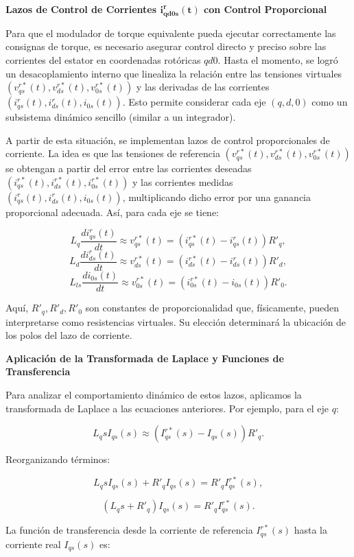 \documentclass{article}
\begin{document}
\textbf{Lazos de Control de Corrientes \(\boldsymbol{i^r_{q d 0 s}(t)}\) con Control Proporcional}

Para que el modulador de torque equivalente pueda ejecutar correctamente las consignas de torque, es necesario asegurar control directo y preciso sobre las corrientes del estator en coordenadas rotóricas \( qd0 \). Hasta el momento, se logró un desacoplamiento interno que linealiza la relación entre las tensiones virtuales \((v_{qs}^{r*}(t), v_{ds}^{r*}(t), v_{0s}^{r*}(t))\) y las derivadas de las corrientes \((i_{qs}^r(t), i_{ds}^r(t), i_{0s}(t))\). Esto permite considerar cada eje \((q,d,0)\) como un subsistema dinámico sencillo (similar a un integrador).

A partir de esta situación, se implementan lazos de control proporcionales de corriente. La idea es que las tensiones de referencia \((v_{qs}^{r*}(t), v_{ds}^{r*}(t), v_{0s}^{r*}(t))\) se obtengan a partir del error entre las corrientes deseadas \((i_{qs}^{r*}(t), i_{ds}^{r*}(t), i_{0s}^{r*}(t))\) y las corrientes medidas \((i_{qs}^r(t), i_{ds}^r(t), i_{0s}(t))\), multiplicando dicho error por una ganancia proporcional adecuada. Así, para cada eje se tiene:

\[
L_q \frac{d i_{qs}^r(t)}{dt} \approx v_{qs}^{r*}(t) = (i_{qs}^{r*}(t) - i_{qs}^r(t)) R'_q,
\]
\[
L_d \frac{d i_{ds}^r(t)}{dt} \approx v_{ds}^{r*}(t) = (i_{ds}^{r*}(t) - i_{ds}^r(t)) R'_d,
\]
\[
L_{ls} \frac{d i_{0s}(t)}{dt} \approx v_{0s}^{r*}(t) = (i_{0s}^{r*}(t) - i_{0s}(t)) R'_0.
\]

Aquí, \(R'_q, R'_d, R'_0\) son constantes de proporcionalidad que, físicamente, pueden interpretarse como resistencias virtuales. Su elección determinará la ubicación de los polos del lazo de corriente.

\textbf{Aplicación de la Transformada de Laplace y Funciones de Transferencia}

Para analizar el comportamiento dinámico de estos lazos, aplicamos la transformada de Laplace a las ecuaciones anteriores. Por ejemplo, para el eje \(q\):

\[
L_q s I_{qs}(s) \approx (I_{qs}^{r*}(s) - I_{qs}(s)) R'_q.
\]

Reorganizando términos:

\[
L_q s I_{qs}(s) + R'_q I_{qs}(s) = R'_q I_{qs}^{r*}(s),
\]

\[
(L_q s + R'_q) I_{qs}(s) = R'_q I_{qs}^{r*}(s).
\]

La función de transferencia desde la corriente de referencia \(I_{qs}^{r*}(s)\) hasta la corriente real \(I_{qs}(s)\) es:
\end{document}
